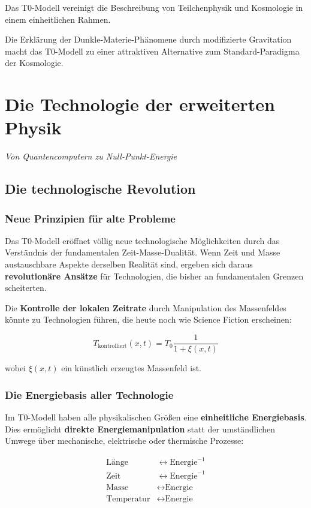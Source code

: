 \documentclass[12pt,a4paper]{report}
\begin{document}
	Das T0-Modell vereinigt die Beschreibung von Teilchenphysik und Kosmologie in einem einheitlichen Rahmen.
	
	Die Erklärung der Dunkle-Materie-Phänomene durch modifizierte Gravitation macht das T0-Modell zu einer attraktiven Alternative zum Standard-Paradigma der Kosmologie.
	\chapter{Die Technologie der erweiterten Physik}
	\textit{Von Quantencomputern zu Null-Punkt-Energie}
	
	\section{Die technologische Revolution}
	
	\subsection{Neue Prinzipien für alte Probleme}
	
	Das T0-Modell eröffnet völlig neue technologische Möglichkeiten durch das Verständnis der fundamentalen Zeit-Masse-Dualität. Wenn Zeit und Masse austauschbare Aspekte derselben Realität sind, ergeben sich daraus \textbf{revolutionäre Ansätze} für Technologien, die bisher an fundamentalen Grenzen scheiterten.
	
	Die \textbf{Kontrolle der lokalen Zeitrate} durch Manipulation des Massenfeldes könnte zu Technologien führen, die heute noch wie Science Fiction erscheinen:
	
	\begin{equation}
		T_{\text{kontrolliert}}(x,t) = T_0 \frac{1}{1 + \xi(x,t)}
	\end{equation}
	
	wobei $\xi(x,t)$ ein künstlich erzeugtes Massenfeld ist.
	
	\subsection{Die Energiebasis aller Technologie}
	
	Im T0-Modell haben alle physikalischen Größen eine \textbf{einheitliche Energiebasis}. Dies ermöglicht \textbf{direkte Energiemanipulation} statt der umständlichen Umwege über mechanische, elektrische oder thermische Prozesse:
	
	\begin{align}
		\text{Länge} &\leftrightarrow \text{Energie}^{-1} \\
		\text{Zeit} &\leftrightarrow \text{Energie}^{-1} \\
		\text{Masse} &\leftrightarrow \text{Energie} \\
		\text{Temperatur} &\leftrightarrow \text{Energie}
	\end{align}
	
\end{document}
